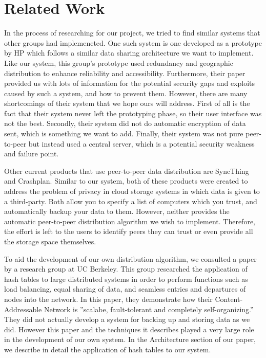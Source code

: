 \section{Related Work}
In the process of researching for our project, we tried to find similar systems that other groups had implemeneted.  One such system is one developed as a prototype by HP which follows a similar data sharing architecture we want to implement. \cite{hp} Like our system, this group's prototype used redundancy and geographic distribution to enhance reliability and accessibility.  Furthermore, their paper provided us with lots of information for the potential security gaps and exploits caused by such a system, and how to prevent them.  However, there are many shortcomings of their system that we hope ours will address.  First of all is the fact that their system never left the prototyping phase, so their user interface was not the best.  Secondly, their system did not do automatic encryption of data sent, which is something we want to add.  Finally, their system was not pure peer-to-peer but instead used a central server, which is a potential security weakness and failure point.

Other current products that use peer-to-peer data distribution are SyncThing and Crashplan. \cite{syncthing} \cite{crashplan} Similar to our system, both of these products were created to address the problem of privacy in cloud storage systems in which data is given to a third-party.  Both allow you to specify a list of computers which you trust, and automatically backup your data to them.  However, neither provides the automatic peer-to-peer distribution algorithm we wish to implement.  Therefore, the effort is left to the users to identify peers they can trust or even provide all the storage space themselves.

To aid the development of our own distribution algorithm, we consulted a paper by a research group at UC Berkeley.  \cite{scalable}  This group researched the application of hash tables to large distributed systems in order to perform functions such as load balancing, equal sharing of data, and seamless entries and departures of nodes into the network.  In this paper, they demonstrate how their Content-Addressable Network is ''scalabe, fault-tolerant and completely self-organizing.''  They did not actually develop a system for backing up and storing data as we did.  However this paper and the techniques it describes played a very large role in the development of our own system.  In the Architecture section of our paper, we describe in detail the application of hash tables to our system.

